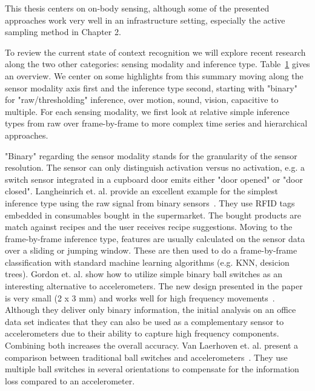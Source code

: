\begin{table}
\begin{tabularx}{ \textwidth+5pt}{ c| c c c}
\end{tabularx}

\label{table:activity}
\end{table}


This thesis centers on on-body sensing, although some of the presented approaches 
 work very well in an infrastructure setting, especially the active sampling method in Chapter 2.

To review the current state of context recognition
we will explore recent research along the two other categories:
sensing modality and inference type. Table~\ref{table:activity} gives
an overview. We center on some highlights from this summary  
moving along the sensor modality axis first and the inference type second, starting with "binary" for "raw/thresholding" inference, over motion, sound, vision, capacitive to multiple. For each sensing modality, we first look at relative simple inference types from raw over frame-by-frame to more complex time series and hierarchical approaches.

"Binary" regarding the sensor modality stands for the granularity of the sensor resolution.
The sensor can only distinguish activation versus no activation, e.g. a switch sensor integrated in a cupboard door emits either "door opened" or "door closed". Langheinrich et. al. provide an excellent example for
the simplest inference type using the raw signal from binary sensors~\cite{Langheinrich:2000vb}. 
They use RFID tags embedded in consumables bought in the supermarket. The bought products are match against recipes and the user receives recipe suggestions. Moving to the frame-by-frame inference type, 
features are usually calculated on the sensor data over a sliding or jumping window.
These are then used to do a frame-by-frame classification with standard
machine learning algorithms (e.g. KNN, desicion trees). 
Gordon et. al. show how to utilize simple binary ball switches 
as an interesting alternative to accelerometers. The new design
presented in the paper is very small (2 x 3 mm) and works
well for high frequency movements~\cite{5665861}. Although they
deliver only binary information, the initial analysis on an office
data set indicates that they can also be used
as a complementary sensor to accelerometers due to their ability to
capture high frequency components. Combining both increases the overall accuracy. 
Van Laerhoven et. al. present a comparison between traditional ball switches and
accelerometers~\cite{laerhovengellersen2004}. They use multiple ball switches
in several orientations to compensate for the information loss 
compared to an accelerometer. 

